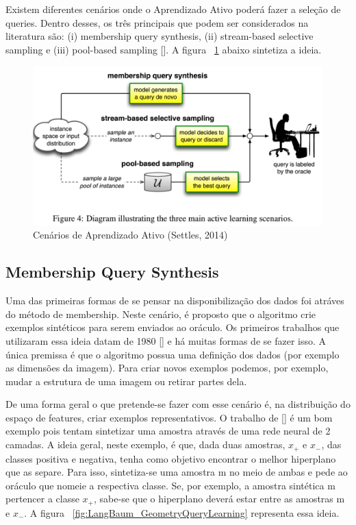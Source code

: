 Existem diferentes cenários onde o Aprendizado Ativo poderá fazer a seleção de queries. Dentro desses, os três principais que podem ser considerados na literatura são: (i) membership query synthesis, (ii) stream-based selective sampling e (iii) pool-based sampling [\cite{settles2014active}]. A figura ~\ref{fig:ActiveLearningScenarios} abaixo sintetiza a ideia.


\begin{figure}
  \centering
  \includegraphics[width=.8\textwidth]{figures/active_learning_scenarios.png}
  \caption{Cenários de Aprendizado Ativo (Settles, 2014)}
  \label{fig:ActiveLearningScenarios}
\end{figure}


\subsection{Membership Query Synthesis}
\label{sec:cenarios_membeship}

Uma das primeiras formas de se pensar na disponibilização dos dados foi atráves do método de membership. Neste cenário, é proposto que o algoritmo crie exemplos sintéticos para serem enviados ao oráculo. Os primeiros trabalhos que utilizaram essa ideia datam de 1980 [\cite{shapiro1981algorithm, shapiro1982algorithmic, shapiro198algorithmic_2}] e há muitas formas de se fazer isso. A única premissa é que o algoritmo possua uma definição dos dados (por exemplo as dimensões da imagem). Para criar novos exemplos podemos, por exemplo, mudar a estrutura de uma imagem ou retirar partes dela.

De uma forma geral o que pretende-se fazer com esse cenário é, na distribuição do espaço de features, criar exemplos representativos. O trabalho de [\cite{baum1992query}] é um bom exemplo pois tentam sintetizar uma amostra através de uma rede neural de 2 camadas. A ideia geral, neste exemplo, é que, dada duas amostras, $x_+$ e $x_-$, das classes positiva e negativa, tenha como objetivo encontrar o melhor hiperplano que as separe. Para isso, sintetiza-se uma amostra m no meio de ambas e pede ao oráculo que nomeie a respectiva classe. Se, por exemplo, a amostra sintética m pertencer a classe $x_+$, sabe-se que o hiperplano deverá estar entre as amostras m e $x_-$. A figura ~\ref{fig:LangBaum_GeometryQueryLearning} representa essa ideia. 

